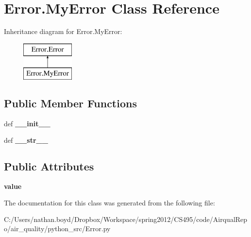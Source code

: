 \hypertarget{class_error_1_1_my_error}{\section{Error.\-My\-Error Class Reference}
\label{class_error_1_1_my_error}
}
Inheritance diagram for Error.\-My\-Error\-:\begin{figure}[H]
\begin{center}
\leavevmode
\includegraphics[height=2.000000cm]{class_error_1_1_my_error}
\end{center}
\end{figure}
\subsection*{Public Member Functions}
\begin{DoxyCompactItemize}
\item 
\hypertarget{class_error_1_1_my_error_a7a269ccbf9182b2a818d1a33c0436bce}{def {\bfseries \-\_\-\-\_\-init\-\_\-\-\_\-}}\label{class_error_1_1_my_error_a7a269ccbf9182b2a818d1a33c0436bce}

\item 
\hypertarget{class_error_1_1_my_error_a7ce4fb2ab3d7e6ef6a393c4e09c99618}{def {\bfseries \-\_\-\-\_\-str\-\_\-\-\_\-}}\label{class_error_1_1_my_error_a7ce4fb2ab3d7e6ef6a393c4e09c99618}

\end{DoxyCompactItemize}
\subsection*{Public Attributes}
\begin{DoxyCompactItemize}
\item 
\hypertarget{class_error_1_1_my_error_a768d5e180ecca5aaf742c1389dcfeb00}{{\bfseries value}}\label{class_error_1_1_my_error_a768d5e180ecca5aaf742c1389dcfeb00}

\end{DoxyCompactItemize}


The documentation for this class was generated from the following file\-:\begin{DoxyCompactItemize}
\item 
C\-:/\-Users/nathan.\-boyd/\-Dropbox/\-Workspace/spring2012/\-C\-S495/code/\-Airqual\-Repo/air\-\_\-quality/python\-\_\-src/Error.\-py\end{DoxyCompactItemize}
